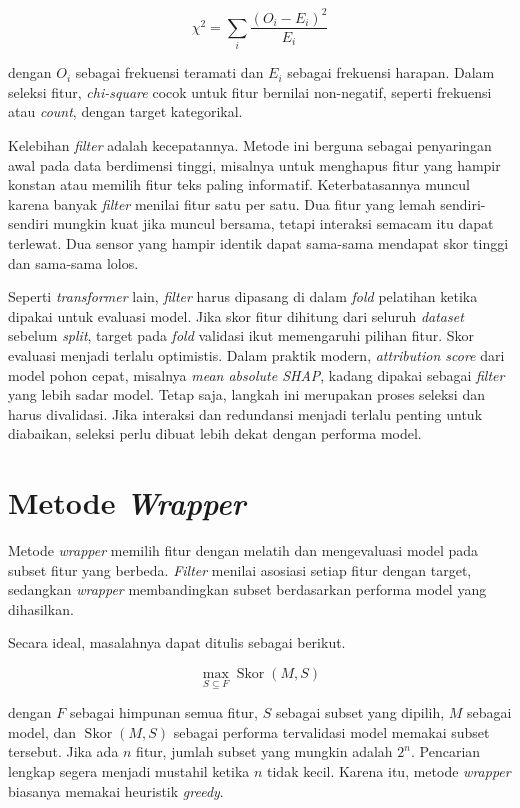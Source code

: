 \[
\chi^2 = \sum_i \dfrac{(O_i - E_i)^2}{E_i}
\]

dengan \(O_i\) sebagai frekuensi teramati dan \(E_i\) sebagai frekuensi harapan. Dalam seleksi fitur, \emph{chi-square} cocok untuk fitur bernilai non-negatif, seperti frekuensi atau \emph{count}, dengan target kategorikal.

Kelebihan \emph{filter} adalah kecepatannya. Metode ini berguna sebagai penyaringan awal pada data berdimensi tinggi, misalnya untuk menghapus fitur yang hampir konstan atau memilih fitur teks paling informatif. Keterbatasannya muncul karena banyak \emph{filter} menilai fitur satu per satu. Dua fitur yang lemah sendiri-sendiri mungkin kuat jika muncul bersama, tetapi interaksi semacam itu dapat terlewat. Dua sensor yang hampir identik dapat sama-sama mendapat skor tinggi dan sama-sama lolos.

Seperti \emph{transformer} lain, \emph{filter} harus dipasang di dalam \emph{fold} pelatihan ketika dipakai untuk evaluasi model. Jika skor fitur dihitung dari seluruh \emph{dataset} sebelum \emph{split}, target pada \emph{fold} validasi ikut memengaruhi pilihan fitur. Skor evaluasi menjadi terlalu optimistis. Dalam praktik modern, \emph{attribution score} dari model pohon cepat, misalnya \emph{mean absolute SHAP}, kadang dipakai sebagai \emph{filter} yang lebih sadar model. Tetap saja, langkah ini merupakan proses seleksi dan harus divalidasi. Jika interaksi dan redundansi menjadi terlalu penting untuk diabaikan, seleksi perlu dibuat lebih dekat dengan performa model.

\section{\texorpdfstring{Metode \emph{Wrapper}}{Metode Wrapper}}\label{metode-wrapper}

Metode \emph{wrapper} memilih fitur dengan melatih dan mengevaluasi model pada subset fitur yang berbeda. \emph{Filter} menilai asosiasi setiap fitur dengan target, sedangkan \emph{wrapper} membandingkan subset berdasarkan performa model yang dihasilkan.

Secara ideal, masalahnya dapat ditulis sebagai berikut.

\[
\max_{S \subseteq F} \operatorname{Skor}(M, S)
\]

dengan \(F\) sebagai himpunan semua fitur, \(S\) sebagai subset yang dipilih, \(M\) sebagai model, dan \(\operatorname{Skor}(M, S)\) sebagai performa tervalidasi model memakai subset tersebut. Jika ada \(n\) fitur, jumlah subset yang mungkin adalah \(2^n\). Pencarian lengkap segera menjadi mustahil ketika \(n\) tidak kecil. Karena itu, metode \emph{wrapper} biasanya memakai heuristik \emph{greedy}.


